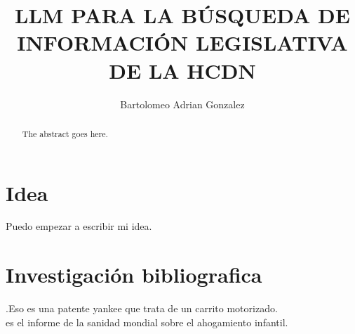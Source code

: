 \documentclass[journal]{IEEEtran}
\begin{document}
\title{LLM PARA LA BÚSQUEDA DE INFORMACIÓN LEGISLATIVA DE LA HCDN}

\author{Bartolomeo Adrian Gonzalez}

\maketitle

\begin{abstract}
The abstract goes here.
\end{abstract}
\section{Idea}
Puedo empezar a escribir mi idea.

\cite{nahmias2004models}

\section{Investigación bibliografica}

\cite{voeks1970self}.Eso es una patente yankee que trata de un carrito motorizado.\\
\cite{OMS2018} es el informe de la sanidad mondial sobre el ahogamiento infantil.




\end{document}
